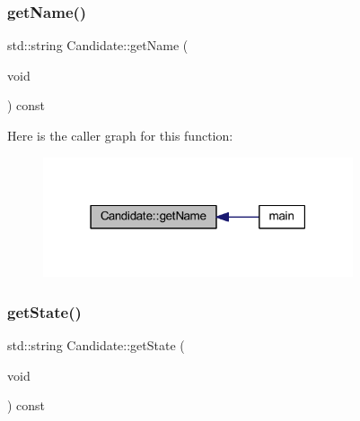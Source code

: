 \hypertarget{class_candidate_a10f8f982418cc3db29c6f211a2b24ebf}{}\label{class_candidate_a10f8f982418cc3db29c6f211a2b24ebf} 
\subsubsection{\texorpdfstring{get\+Name()}{getName()}}
{\footnotesize\ttfamily std\+::string Candidate\+::get\+Name (\begin{DoxyParamCaption}\item[{void}]{ }\end{DoxyParamCaption}) const\hspace{0.3cm}{\ttfamily [inline]}}

Here is the caller graph for this function\+:
\nopagebreak
\begin{figure}[H]
\begin{center}
\leavevmode
\includegraphics[width=259pt]{class_candidate_a10f8f982418cc3db29c6f211a2b24ebf_icgraph}
\end{center}
\end{figure}
\hypertarget{class_candidate_a31fdda5e5a9cb8abbe3506b5a8bc33ab}{}\label{class_candidate_a31fdda5e5a9cb8abbe3506b5a8bc33ab} 
\subsubsection{\texorpdfstring{get\+State()}{getState()}}
{\footnotesize\ttfamily std\+::string Candidate\+::get\+State (\begin{DoxyParamCaption}\item[{void}]{ }\end{DoxyParamCaption}) const\hspace{0.3cm}{\ttfamily [inline]}}

\hypertarget{class_candidate_a50e84cbce900de9863aefb0f5f4a6f68}{}\label{class_candidate_a50e84cbce900de9863aefb0f5f4a6f68} 
